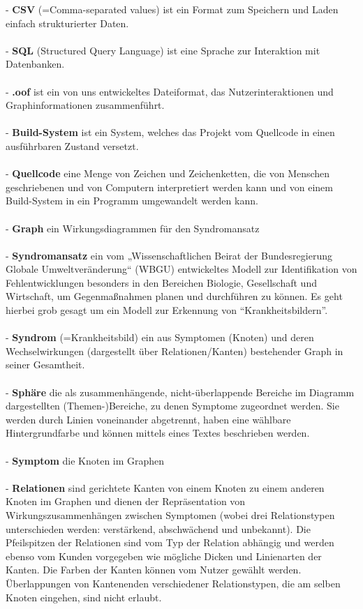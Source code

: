 \documentclass[enabledeprecatedfontcommands,fontsize=11pt,paper=a4,twoside]{scrartcl}
\newcounter{one}
\begin{document}
- \textbf{CSV} (=Comma-separated values) ist ein Format zum Speichern und Laden einfach strukturierter Daten.\\ \\
- \textbf{SQL} (Structured Query Language) ist eine Sprache zur Interaktion mit Datenbanken. \\ \\
- \textbf{.oof} ist ein von uns entwickeltes Dateiformat, das Nutzerinteraktionen und Graphinformationen zusammenführt. \\ \\
- \textbf{Build-System} ist ein System, welches das Projekt vom Quellcode in einen ausführbaren Zustand versetzt. \\ \\
- \textbf{Quellcode} eine Menge von Zeichen und Zeichenketten, die von Menschen geschriebenen und von Computern interpretiert werden kann und von einem Build-System in ein Programm umgewandelt werden kann.  \\ \\
- \textbf{Graph} ein Wirkungsdiagrammen für den Syndromansatz  \\ \\
- \textbf{\hypertarget{Syndromansatz}{Syndromansatz}} ein vom „Wissenschaftlichen Beirat der Bundesregierung Globale Umweltveränderung“ (WBGU) entwickeltes Modell zur Identifikation von Fehlentwicklungen besonders in den Bereichen Biologie, Gesellschaft und Wirtschaft, um Gegenmaßnahmen planen und durchführen zu können. Es geht hierbei grob gesagt um ein Modell zur Erkennung von ``Krankheitsbildern''. \\ \\
- \textbf{Syndrom} (=Krankheitsbild) ein aus Symptomen (Knoten) und deren Wechselwirkungen (dargestellt über Relationen/Kanten) bestehender Graph in seiner Gesamtheit. \\ \\
- \textbf{\hypertarget{Sphäre}{Sphäre}} die als zusammenhängende, nicht-überlappende Bereiche im Diagramm dargestellten (Themen-)Bereiche, zu denen  Symptome zugeordnet werden. Sie werden durch Linien voneinander abgetrennt, haben eine wählbare Hintergrundfarbe und können mittels eines Textes beschrieben werden. \\ \\
- \textbf{\hypertarget{Symptom}{Symptom}} die Knoten im Graphen  \\ \\
- \textbf{Relationen} sind gerichtete Kanten von einem Knoten zu einem anderen Knoten im Graphen und dienen der Repräsentation von Wirkungszusammenhängen zwischen Symptomen (wobei drei Relationstypen unterschieden werden: verstärkend, abschwächend und unbekannt). Die Pfeilspitzen der Relationen sind vom Typ der Relation abhängig und werden ebenso vom Kunden vorgegeben wie mögliche Dicken und Linienarten der Kanten. Die Farben der Kanten können vom Nutzer gewählt werden. Überlappungen von Kantenenden verschiedener Relationstypen, die am selben Knoten eingehen, sind nicht erlaubt. \\ \\
\end{document}
